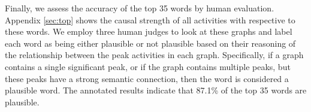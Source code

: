 
Finally, we assess the accuracy of the top 35 words by human evaluation. Appendix \ref{sec:top}
shows the causal strength of all activities with respective to these words.
We employ three human judges to look at these graphs and label each word as being either
plausible or not plausible based on their reasoning of the relationship between the peak 
activities in each graph. Specifically, if a graph contains a single significant peak, or if
the graph contains multiple peaks, but these peaks have a strong semantic connection, then
the word is considered a plausible word. The annotated results indicate that 87.1\% of the top
35 words are plausible. 
